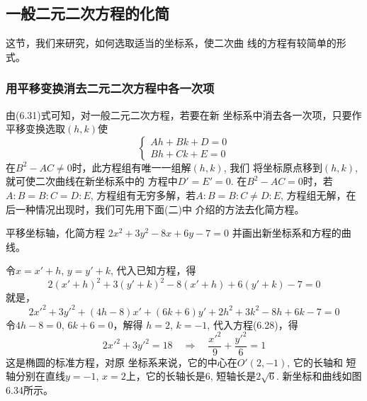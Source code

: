 \subsection{一般二元二次方程的化简}
这节，我们来研究，如何选取适当的坐标系，使二次曲
线的方程有较简单的形式。

\subsubsection{用平移变换消去二元二次方程中各一次项}
由(6.31)式可知，对一般二元二次方程，若要在新
坐标系中消去各一次项，只要作平移变换选取$(h,k)$使
\[\begin{cases}
   Ah+Bk+D=0\\
Bh+Ck+E=0
\end{cases}\]
在$B^2-AC\ne 0$时，此方程组有唯一一组解$(h,k)$, 我们
将坐标原点移到$(h,k)$, 就可使二次曲线在新坐标系中的
方程中$D'=E'=0$. 在$B^2-AC=0$时，若$A:B=B:C
=D:E$, 方程组有无穷多解，若$A:B=B:C\ne D:E$, 
方程组无解，在后一种情况出现时，我们可先用下面(二)中
介绍的方法去化简方程。

\begin{example}
    平移坐标轴，化简方程
$2x^2+3y^2-8x+6y-7=0$
并画出新坐标系和方程的曲线。
\end{example}

\begin{solution}
    令$x=x'+h$, $y=y'+k$, 代入已知方程，得
\[2(x'+h)^2+3(y'+k)^2-8(x'+h)+6(y'+k)-7=0\]
就是，
\[2{x'}^2+3{y'}^2+(4h-8)x'+(6k+6)y'+2h^2+3k^2
-8h+6k-7=0\]
令$4h-8=0$, $6k+6=0$，解得
$h=2$, $k=-1$, 代入方程(6.28)，得
\[2{x'}^2+3{y'}^2=18\quad \Rightarrow\quad \frac{{x'}^2}{9}+\frac{{y'}^2}{6}=1\]
这是椭圆的标准方程，对原
坐标系来说，它的中心在$O'(2,-1)$, 它的长轴和
短轴分别在直线$y=-1$, 
$x=2$上，它的长轴长是6, 短轴长是$2\sqrt{6}$. 新坐标和曲线如图6.34所示。
\end{solution}

